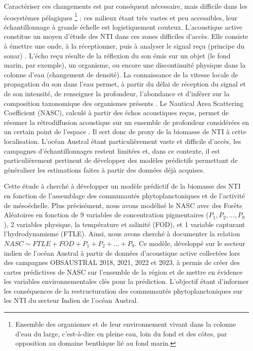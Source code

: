 Caractériser ces changements est par conséquent nécessaire, mais difficile dans les écosystèmes pélagiques \footnote{Ensemble des organismes et de leur environnement vivant dans la colonne d'eau du large, c'est-à-dire en pleine eau, loin du fond et des côtes, par opposition au domaine benthique lié au fond marin.} : ces milieux étant très vastes et peu accessibles, leur échantillonnage à grande échelle est logistiquement couteux. L'acoustique active constitue un moyen d'étude des NTI dans ces zones difficiles d'accès. Elle consiste à émettre une onde, à la réceptionner, puis à analyser le signal reçu (principe du sonar) \cite{benoitbird2016ecological}. L'écho reçu résulte de la réflexion du son émis sur un objet (le fond marin, par exemple), un organisme, ou encore une discontinuité physique dans la colonne d'eau (changement de densité). La connaissance de la vitesse locale de propagation du son dans l'eau permet, à partir du délai de réception du signal et de son intensité, de renseigner la profondeur, l'abondance et d'inférer sur la composition taxonomique des organismes présents \cite{benoitbird2016ecological}. Le Nautical Area Scattering Coefficient (NASC), calculé à partir des échos acoustiques reçus, permet de résumer la rétrodiffusion acoustique sur un ensemble de profondeur considérées en un certain point de l'espace \cite{maclennan2002}. Il sert donc de proxy de la biomasse de NTI à cette localisation. L'océan Austral étant particulièrement vaste et difficile d'accès, les campagnes d'échantillonnages restent limitées et, dans ce contexte, il est particulièrement pertinent de développer des modèles prédictifs permettant de généraliser les estimations faites à partir des données déjà acquises.

\vspace{0.3cm}

Cette étude à cherché à développer un modèle prédictif de la biomasse des NTI en fonction de l'assemblage des communautés phytoplanctoniques et de l'activité de mésoéchelle. Plus précisément, nous avons modélisé le NASC avec des Forêts Aléatoires en fonction de 9 variables de concentration pigmentaires ($P_1, P_2, \ldots, P_9$), 2 variables physique, la température et salinité (FOD), et 1 variable capturant l'hydrodynamisme (FTLE). Ainsi, nous avons cherché à documenter la relation $NASC \sim FTLE + FOD + P_1 + P_2 + \ldots + P_9$. Ce modèle, développé sur le secteur indien de l'océan Austral à partir de données d'acoustique active collectées lors des campagnes OBSAUSTRAL 2018, 2021, 2022 et 2023, à permis de créer des cartes prédictives de NASC sur l'ensemble de la région et de mettre en évidence les variables environnementales clés pour la prédiction. L'objectif étant d'informer les conséquences de la restructuration des communautés phytoplanctoniques sur les NTI du secteur Indien de l'océan Austral.

